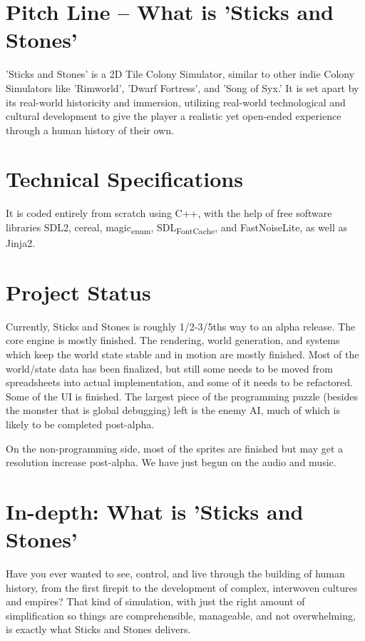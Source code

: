 \documentclass[11pt]{article}
\date{\today}
\title{}
\begin{document}
\tableofcontents

\section{Pitch Line -- What is 'Sticks and Stones'}
\label{sec:org7ad3a4c}
'Sticks and Stones' is a 2D Tile Colony Simulator, similar to other indie Colony Simulators like 'Rimworld', 'Dwarf Fortress', and 'Song of Syx.' It is set apart by its real-world historicity and immersion, utilizing real-world technological and cultural development to give the player a realistic yet open-ended experience through a human history of their own. 
\section{Technical Specifications}
\label{sec:org4033c32}
It is coded entirely from scratch using C++, with the help of free software libraries SDL2, cereal, magic\textsubscript{enum}, SDL\textsubscript{FontCache}, and FastNoiseLite, as well as Jinja2. 
\section{Project Status}
\label{sec:orgeb71686}
Currently, Sticks and Stones is roughly 1/2-3/5ths way to an alpha release. The core engine is mostly finished. The rendering, world generation, and systems which keep the world state stable and in motion are mostly finished. Most of the world/state data has been finalized, but still some needs to be moved from spreadsheets into actual implementation, and some of it needs to be refactored. Some of the UI is finished. The largest piece of the programming puzzle (besides the monster that is global debugging) left is the enemy AI, much of which is likely to be completed post-alpha. 

On the non-programming side, most of the sprites are finished but may get a resolution increase post-alpha. We have just begun on the audio and music.
\section{In-depth: What is 'Sticks and Stones'}
\label{sec:org7c5df0a}
Have you ever wanted to see, control, and live through the building of human history, from the first firepit to the development of complex, interwoven cultures and empires? That kind of simulation, with just the right amount of simplification so things are comprehensible, manageable, and not overwhelming, is exactly what Sticks and Stones delivers. 
\end{document}
